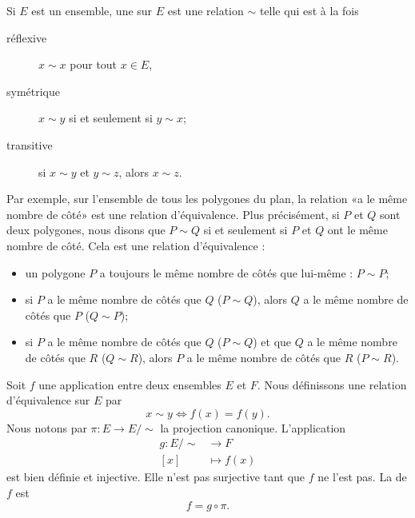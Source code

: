 \begin{definition}  \label{DefHoJzMp}
Si $E$ est un ensemble, une  sur $E$ est une relation $\sim$ telle qui est à la fois
\begin{description}
	\item[réflexive] $x\sim x$ pour tout $x\in E$,
	\item[symétrique] $x\sim y$ si et seulement si $y\sim x$;
	\item[transitive] si $x\sim y$ et $y\sim z$, alors $x\sim z$.
\end{description}
\end{definition}

Par exemple, sur l'ensemble de tous les polygones du plan, la relation «a le même nombre de côté» est une relation d'équivalence. Plus précisément, si $P$ et $Q$ sont deux polygones, nous disons que $P\sim Q$ si et seulement si $P$ et $Q$ ont le même nombre de côté. Cela est une relation d'équivalence :
\begin{itemize}
	\item 
		un polygone $P$ a toujours le même nombre de côtés que lui-même : $P\sim P$;
	\item
		si $P$ a le même nombre de côtés que $Q$ ($P\sim Q$), alors $Q$ a le même nombre de côtés que $P$ ($Q\sim P$);
	\item
		si $P$ a le même nombre de côtés que $Q$ ($P\sim Q$) et que $Q$ a le même nombre de côtés que $R$ ($Q\sim R$), alors $P$ a le même nombre de côtés que $R$ ($P\sim R$).
\end{itemize}

Soit \( f\) une application entre deux ensembles \( E\) et \( F\). Nous définissons une relation d'équivalence sur \( E\) par
\begin{equation}
    x\sim y\Leftrightarrow f(x)=f(y).
\end{equation}
Nous notons par \( \pi\colon E\to E/\sim\) la projection canonique. L'application
\begin{equation}
    \begin{aligned}
        g\colon E/\sim&\to F \\
        [x]&\mapsto f(x) 
    \end{aligned}
\end{equation}
est bien définie et injective. Elle n'est pas surjective tant que \( f\) ne l'est pas. La  de \( f\) est 
\begin{equation}
    f=g\circ\pi.
\end{equation}

